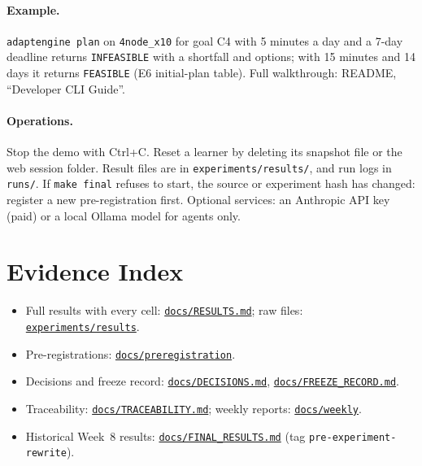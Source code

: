\documentclass[11pt,a4paper]{article}
\newcommand{\finaltag}{cs5903-final-2026}
\newcommand{\repobase}{https://github.com/vhemanth06/AdaptEngine}
\newcommand{\repo}[1]{\href{\repobase/blob/\finaltag/#1}{\nolinkurl{#1}}}
\newcommand{\repodir}[1]{\href{\repobase/tree/\finaltag/#1}{\nolinkurl{#1}}}
\begin{document}
\paragraph{Example.} \texttt{adaptengine plan} on \texttt{4node\_x10} for goal C4 with 5 minutes a day and a 7-day deadline returns \texttt{INFEASIBLE} with a shortfall and options; with 15 minutes and 14 days it returns \texttt{FEASIBLE} (E6 initial-plan table). Full walkthrough: README, ``Developer CLI Guide''.

\paragraph{Operations.} Stop the demo with Ctrl+C. Reset a learner by deleting its snapshot file or the web session folder. Result files are in \texttt{experiments/results/}, and run logs in \texttt{runs/}. If \texttt{make final} refuses to start, the source or experiment hash has changed: register a new pre-registration first. Optional services: an Anthropic API key (paid) or a local Ollama model for agents only.

\section{Evidence Index}

\begin{itemize}
\item Full results with every cell: \repo{docs/RESULTS.md}; raw files: \repodir{experiments/results}.
\item Pre-registrations: \repodir{docs/preregistration}.
\item Decisions and freeze record: \repo{docs/DECISIONS.md}, \repo{docs/FREEZE_RECORD.md}.
\item Traceability: \repo{docs/TRACEABILITY.md}; weekly reports: \repodir{docs/weekly}.
\item Historical Week~8 results: \repo{docs/FINAL_RESULTS.md} (tag \texttt{pre-experiment-rewrite}).
\end{itemize}
\end{document}

